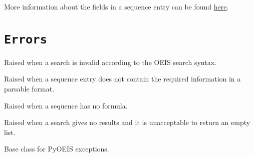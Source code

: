 \documentclass[letterpaper,10pt,english]{sphinxmanual}
\begin{document}
More information about the fields in a sequence entry can be found \href{http://oeis.org/eishelp2.html}{here}.


\section{\texttt{Errors}}
\label{api:module-errors}\label{api:errors}

\begin{fulllineitems}
\label{api:errors.InvalidQueryError}
Raised when a search is invalid according to the OEIS search
syntax.

\end{fulllineitems}


\begin{fulllineitems}
\label{api:errors.MalformedSequenceError}
Raised when a sequence entry does not contain the required
information in a parsable format.

\end{fulllineitems}


\begin{fulllineitems}
\label{api:errors.NoFunctionError}
Raised when a sequence has no formula.

\end{fulllineitems}


\begin{fulllineitems}
\label{api:errors.NoResultsError}
Raised when a search gives no results and it is unacceptable to
return an empty list.

\end{fulllineitems}


\begin{fulllineitems}
\label{api:errors.OEISException}
Base class for PyOEIS exceptions.

\end{fulllineitems}
\end{document}
